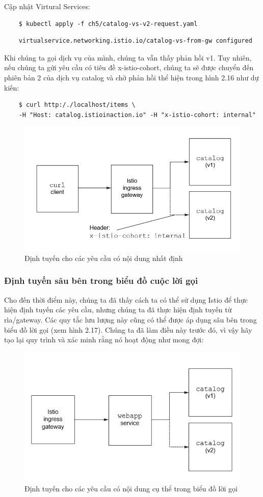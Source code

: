\documentclass[12pt,a4paper]{report}
\begin{document}
Cập nhật Virtural Services:
\begin{lstlisting}
	$ kubectl apply -f ch5/catalog-vs-v2-request.yaml 
\end{lstlisting}
\begin{verbatim}
	virtualservice.networking.istio.io/catalog-vs-from-gw configured
\end{verbatim}

Khi chúng ta gọi dịch vụ của mình, chúng ta vẫn thấy phản hồi v1. Tuy nhiên, nếu chúng ta gửi yêu cầu có tiêu đề x-istio-cohort, chúng ta sẽ được chuyển đến phiên bản 2 của dịch vụ catalog và chờ phản hồi thể hiện trong hình 2.16 như dự kiến:
\begin{lstlisting}
	$ curl http:/./localhost/items \
	-H "Host: catalog.istioinaction.io" -H "x-istio-cohort: internal"
\end{lstlisting}
\begin{figure}[h]
	\centering
	\includegraphics[width=0.7\linewidth]{Pics/2.2.2-p2}
	\caption{Định tuyến cho các yêu cầu có nội dung nhất định}
	\label{fig:2.2.2-2}
\end{figure}
			\subsubsection{Định tuyến sâu bên trong biểu đồ cuộc lời gọi}
\hspace{0.6cm}Cho đến thời điểm này, chúng ta đã thấy cách ta có thể sử dụng Istio để thực hiện định tuyến các yêu cầu, nhưng chúng ta đã thực hiện định tuyến từ rìa/gateway. Các quy tắc lưu lượng này cũng có thể được áp dụng sâu bên trong biểu đồ lời gọi (xem hình 2.17). Chúng ta đã làm điều này trước đó, vì vậy hãy tạo lại quy trình và xác minh rằng nó hoạt động như mong đợi:
\begin{figure}[h]
	\centering
	\includegraphics[width=0.7\linewidth]{Pics/2.2.2-p3}
	\caption{Định tuyến cho các yêu cầu có nội dung cụ thể trong biểu đồ lời gọi}
	\label{fig:2.2.2-3}
\end{figure}
\end{document}
